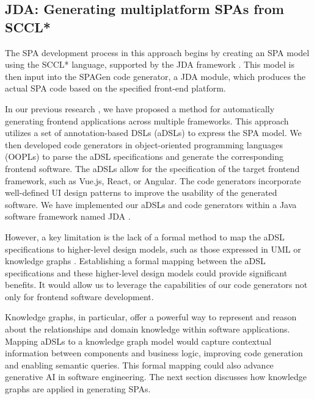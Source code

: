 \documentclass[runningheads]{llncs}
\begin{document}
\subsection{JDA: Generating multiplatform SPAs from SCCL*}
The SPA development process in this approach begins by creating an SPA model using the SCCL* language, supported by the JDA framework \cite{le_generating_2022}. This model is then input into the SPAGen code generator, a JDA module, which produces the actual SPA code based on the specified front-end platform.

In our previous research \cite{le_generating_2022,le_modularly_2024}, we have proposed a method for automatically generating frontend applications across multiple frameworks. This approach utilizes a set of annotation-based DSLs (aDSLs) to express the SPA model. We then developed code generators in object-oriented programming languages (OOPLs) to parse the aDSL specifications and generate the corresponding frontend software. The aDSLs allow for the specification of the target frontend framework, such as Vue.js, React, or Angular. The code generators incorporate well-defined UI design patterns to improve the usability of the generated software. We have implemented our aDSLs and code generators within a Java software framework named JDA \cite{le_jdomainapp_2019,le_generating_2022}.

However, a key limitation is the lack of a formal method to map the aDSL specifications to higher-level design models, such as those expressed in UML \cite{omg2017uml} or knowledge graphs \cite{wang_application_2023}. Establishing a formal mapping between the aDSL specifications and these higher-level design models could provide significant benefits. It would allow us to leverage the capabilities of our code generators not only for frontend software development.

Knowledge graphs, in particular, offer a powerful way to represent and reason about the relationships and domain knowledge within software applications. Mapping aDSLs to a knowledge graph model would capture contextual information between components and business logic, improving code generation and enabling semantic queries. This formal mapping could also advance generative AI in software engineering. The next section discusses how knowledge graphs are applied in generating SPAs.
\end{document}
